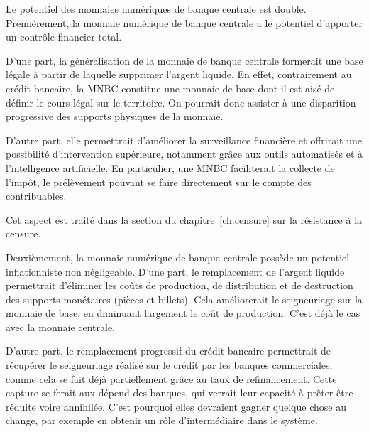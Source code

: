 
Le potentiel des monnaies numériques de banque centrale est double. Premièrement, la monnaie numérique de banque centrale a le potentiel d'apporter un contrôle financier total.

D'une part, la généralisation de la monnaie de banque centrale formerait une base légale à partir de laquelle supprimer l'argent liquide. En effet, contrairement au crédit bancaire, la MNBC constitue une monnaie de base dont il est aisé de définir le cours légal sur le territoire. On pourrait donc assister à une disparition progressive des supports physiques de la monnaie.

D'autre part, elle permettrait d'améliorer la surveillance financière et offrirait une possibilité d'intervention supérieure, notamment grâce aux outils automatisés et à l'intelligence artificielle. En particulier, une MNBC faciliterait la collecte de l'impôt, le prélèvement pouvant se faire directement sur le compte des contribuables.

Cet aspect est traité dans la section du chapitre~\ref{ch:censure} sur la résistance à la censure.


Deuxièmement, la monnaie numérique de banque centrale possède un potentiel inflationniste non négligeable. D'une part, le remplacement de l'argent liquide permettrait d'éliminer les coûts de production, de distribution et de destruction des supports monétaires (pièces et billets). Cela améliorerait le seigneuriage sur la monnaie de base, en diminuant largement le coût de production. C'est déjà le cas avec la monnaie centrale.

D'autre part, le remplacement progressif du crédit bancaire permettrait de récupérer le seigneuriage réalisé sur le crédit par les banques commerciales, comme cela se fait déjà partiellement grâce au taux de refinancement. Cette capture se ferait aux dépend des banques, qui verrait leur capacité à prêter être réduite voire annihilée. C'est pourquoi elles devraient gagner quelque chose au change, par exemple en obtenir un rôle d'intermédiaire dans le système.

